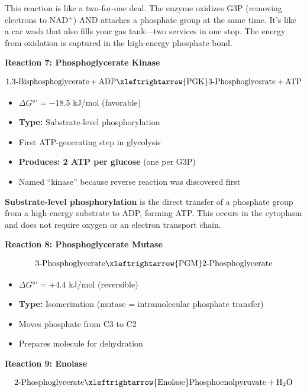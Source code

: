 \begin{analogy}
This reaction is like a two-for-one deal. The enzyme oxidizes G3P (removing electrons to NAD$^+$) AND attaches a phosphate group at the same time. It's like a car wash that also fills your gas tank—two services in one stop. The energy from oxidation is captured in the high-energy phosphate bond.
\end{analogy}

\textbf{Reaction 7: Phosphoglycerate Kinase}

\[
\text{1,3-Bisphosphoglycerate} + \text{ADP} \xleftrightarrow{\text{PGK}} \text{3-Phosphoglycerate} + \text{ATP}
\]

\begin{itemize}
    \item $\Delta G°' = -18.5$ kJ/mol (favorable)
    \item \textbf{Type:} Substrate-level phosphorylation
    \item First ATP-generating step in glycolysis
    \item \textbf{Produces: 2 ATP per glucose} (one per G3P)
    \item Named ``kinase'' because reverse reaction was discovered first
\end{itemize}

\begin{definition}
\textbf{Substrate-level phosphorylation} is the direct transfer of a phosphate group from a high-energy substrate to ADP, forming ATP. This occurs in the cytoplasm and does not require oxygen or an electron transport chain.
\end{definition}

\textbf{Reaction 8: Phosphoglycerate Mutase}

\[
\text{3-Phosphoglycerate} \xleftrightarrow{\text{PGM}} \text{2-Phosphoglycerate}
\]

\begin{itemize}
    \item $\Delta G°' = +4.4$ kJ/mol (reversible)
    \item \textbf{Type:} Isomerization (mutase = intramolecular phosphate transfer)
    \item Moves phosphate from C3 to C2
    \item Prepares molecule for dehydration
\end{itemize}

\textbf{Reaction 9: Enolase}

\[
\text{2-Phosphoglycerate} \xleftrightarrow{\text{Enolase}} \text{Phosphoenolpyruvate} + \text{H}_2\text{O}
\]


